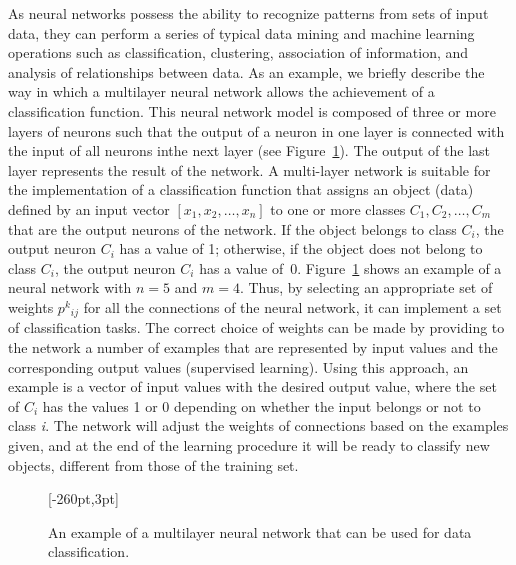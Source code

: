 As neural networks possess the ability to recognize patterns from sets of input data, they can perform a series of typical data mining and machine learning operations such as classification, clustering, association of information, and analysis of relationships between data. As an example, we briefly describe the way in which a multilayer neural network allows the achievement of a classification function. This neural network model is composed of three or more layers of neurons such that the output of a neuron in one layer is connected with the input of all neurons in\break the next layer (see Figure~\ref{fig:4.4}). The output of the last layer represents the result of the network. A multi-layer network is suitable for the implementation of a classification function that assigns an object (data) defined by an input vector $[x{}_{1}, x{}_{2},\ldots,x_{n}]$ to one or more classes $C{}_{1}, C{}_{2}, \ldots,C{}_{m}$ that are the output neurons of the network. If the object belongs to class $C{}_{i}$, the output neuron $C{}_{i}$ has a value of 1; \hbox{otherwise,} if the object does not belong to class $C{}_{i}$, the output neuron $C{}_{i}$ has a value of~0. Figure~\ref{fig:4.4} shows an example of a neural network with $n = 5$ and $m = 4$. Thus, by selecting an appropriate set of weights $p^{k}{}_{ij}$ for all the connections of the neural network, it can implement a set of classification tasks. The correct choice of weights can be made by providing to the network a number of examples that are represented by input values and the corresponding output values (supervised learning). Using this approach, an example is a vector of input values with the desired output value, where the set of $C{}_{i}$ has the values 1 or 0 depending on whether the input belongs or not to class \textit{i}. The network will adjust the weights of connections based on the examples given, and at the end of the learning procedure it will be ready to classify new objects, different from those of the training set.


\begin{figure}[!t]
[-260pt,3pt]
\caption{\label{fig:4.4}An example of a multilayer neural network that can be used for data classification.}
\end{figure}


